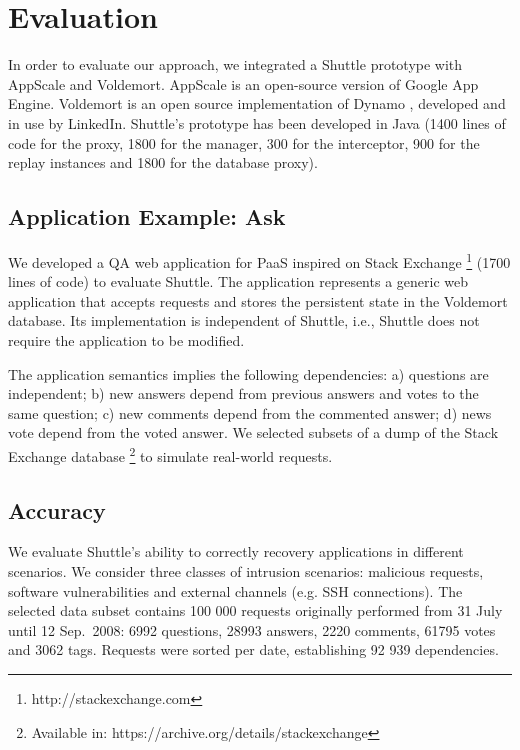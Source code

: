 
\section{Evaluation}
\label{sec:evaluation}

In order to evaluate our approach, we integrated a Shuttle prototype with AppScale and Voldemort. AppScale \cite{Appscale} is an open-source version of Google App Engine. Voldemort \cite{Kreps} is an open source implementation of Dynamo \cite{Decandia2007}, developed and in use by LinkedIn. Shuttle’s prototype has been developed in Java (1400 lines of code for the proxy, 1800 for the manager, 300 for the interceptor, 900 for the replay instances and 1800 for the database proxy).


\subsection{Application Example: Ask}
\label{sec:evaluation:app}

We developed a \acf{QA} web application for \ac{PaaS} inspired on Stack Exchange \footnote{http://stackexchange.com} (1700 lines of code) to evaluate Shuttle. The application represents a generic web application that accepts requests and stores the persistent state in the Voldemort database. Its implementation is independent of Shuttle, i.e., Shuttle does not require the application to be modified. 

The application semantics implies the following dependencies: a) questions are independent; b) new answers depend from previous answers and votes to the same question; c) new comments depend from the commented answer; d) news vote depend from the voted answer. We selected subsets of a dump of the Stack Exchange database \footnote{Available in: https://archive.org/details/stackexchange} to simulate real-world requests. 

\subsection{Accuracy}
\label{sec:evaluation:accuracy}

We evaluate Shuttle's ability to correctly recovery applications in different scenarios. We consider three classes of intrusion scenarios: malicious requests, software vulnerabilities and external channels (e.g. SSH connections). The selected data subset contains 100 000 requests originally performed from 31 July until 12 Sep.~2008: 6992 questions, 28993 answers, 2220 comments, 61795 votes and 3062 tags. Requests were sorted per date, establishing 92 939 dependencies.

